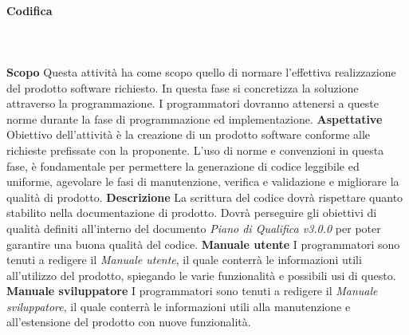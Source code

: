 		\paragraph{Codifica} \mbox{}\\ \mbox{}\\
			\textbf{Scopo} \newline \newline
			Questa attività ha come scopo quello di normare l'effettiva realizzazione del prodotto software richiesto. In questa fase si concretizza la soluzione attraverso la programmazione. I programmatori dovranno attenersi a queste norme durante la fase di programmazione ed implementazione. \newline \newline
			\textbf{Aspettative} \newline \newline
			Obiettivo dell'attività è la creazione di un prodotto software conforme alle richieste prefissate con la proponente.
			L'uso di norme e convenzioni in questa fase, è fondamentale per permettere la generazione di codice leggibile ed uniforme,  agevolare le fasi di manutenzione, verifica e validazione e migliorare la qualità di prodotto. \newline \newline
			\textbf{Descrizione} \newline \newline
			La scrittura del codice dovrà rispettare quanto stabilito nella documentazione di prodotto. Dovrà perseguire gli obiettivi di qualità definiti all'interno del documento \textit{Piano di Qualifica v3.0.0} per poter garantire una buona qualità del codice. \newline \newline
			\textbf{Manuale utente} \newline \newline
			I programmatori sono tenuti a redigere il \textit{Manuale utente}, il quale conterrà le informazioni utili all'utilizzo del prodotto, spiegando le varie funzionalità e possibili usi di questo. \newline \newline
			\textbf{Manuale sviluppatore} \newline \newline
			I programmatori sono tenuti a redigere il \textit{Manuale sviluppatore}, il quale conterrà le informazioni utili alla manutenzione e all'estensione del prodotto con nuove funzionalità. \newline \newline
